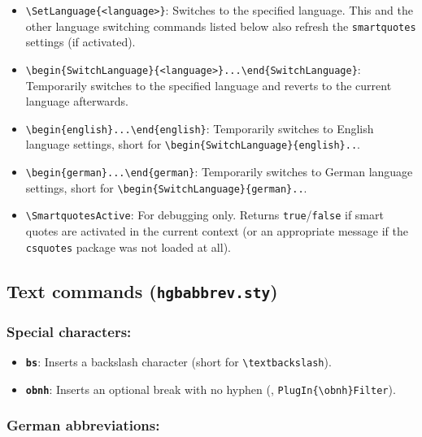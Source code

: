 \documentclass[english]{hgbarticle}
\begin{document}
\begin{itemize}
	\item \verb!\SetLanguage{<language>}!:
    Switches to the specified language.
		This and the other language switching commands listed below
		also refresh the \texttt{smartquotes} settings (if activated).
	\item \verb!\begin{SwitchLanguage}{<language>}...\end{SwitchLanguage}!:
    Temporarily switches to the specified language and reverts to the current language 
		afterwards. 
	\item \verb!\begin{english}...\end{english}!:
    Temporarily switches to English language settings, short for
		\verb!\begin{SwitchLanguage}{english}..!.
	\item \verb!\begin{german}...\end{german}!:
    Temporarily switches to German language settings, short for
		\verb!\begin{SwitchLanguage}{german}..!.
	\item \verb!\SmartquotesActive!:
		For debugging only. Returns \texttt{true}/\texttt{false} if smart quotes are activated in
		the current context (or an appropriate message if the \texttt{csquotes} package was not loaded at all).
\end{itemize}


\subsection{Text commands (\texttt{hgbabbrev.sty})}

\subsubsection*{Special characters:}

\begin{itemize}
    \item \textbf{\texttt{{\bs}bs}}: Inserts a backslash character (short for
    \verb!\textbackslash!).
    \item \textbf{\texttt{{\bs}obnh}}: Inserts an optional break with no
    hyphen (\eg, \verb!PlugIn{\obnh}Filter!).
\end{itemize}


\subsubsection*{German abbreviations:}
\end{document}
